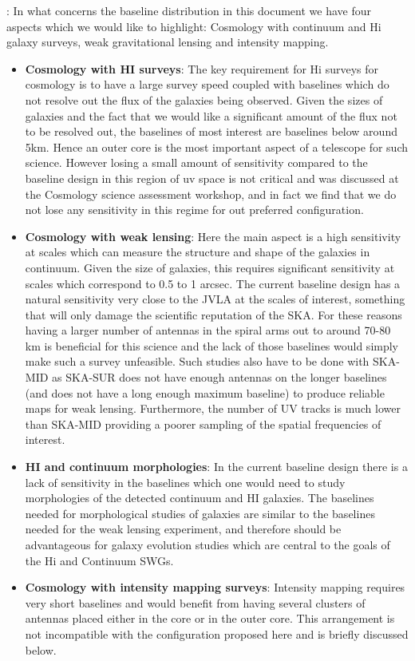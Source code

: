 \documentclass[sfheadings,a4paper,times,9pt,floats,floatfix]{article}
\begin{document}
\smallskip
{}: In what concerns the baseline distribution in this document we have four
aspects which we would like to highlight: Cosmology with continuum and
H{\sc i} galaxy surveys, weak
gravitational lensing and intensity mapping.\\
\begin{itemize}
\item {\bf Cosmology with HI surveys}: The key requirement for H{\sc i}
surveys for cosmology is to have a large
survey speed coupled with baselines which do not resolve out the flux of the galaxies being
observed. Given the sizes of galaxies and the fact that we would like a significant amount of
the flux not to be resolved out, the baselines of most interest are baselines below around
5km. Hence an outer core is the most important aspect of a telescope for such science.
However losing a small amount of sensitivity compared to the baseline design in this region
of uv space is not critical and was discussed at the Cosmology science
assessment workshop, and in fact we find that we do not lose any
sensitivity in this regime for out preferred configuration. 

\item {\bf Cosmology with weak lensing}: Here the main aspect is a high sensitivity at scales which can
measure the structure and shape of the galaxies in continuum. Given the size of galaxies,
this requires significant sensitivity at scales which correspond to
0.5 to 1 arcsec. The current baseline design has a natural sensitivity
very close to the JVLA at the scales of interest, something that will
only damage the scientific reputation of the SKA. 
For these reasons having a larger number of antennas in the spiral arms out to around 70-80
km is beneficial for this science and the lack of those baselines would simply make such a
survey unfeasible. Such studies also have to be done with SKA-MID as SKA-SUR does not have
enough antennas on the longer baselines (and does not have a long
enough maximum baseline) to produce reliable maps for weak
lensing. Furthermore,  the number of UV tracks is much lower than
SKA-MID providing a poorer sampling of the spatial frequencies of
interest. %

\item {\bf HI and continuum morphologies}: In the current baseline design there is a lack of sensitivity
in the baselines which one would need to study morphologies of the detected continuum
and HI galaxies. The baselines needed for morphological studies of galaxies
are similar to the baselines needed for the weak lensing experiment, and therefore should be advantageous for galaxy
evolution studies which are central to the goals of the H{\sc i} and
Continuum SWGs.

\item {\bf Cosmology with intensity mapping surveys}: Intensity mapping requires very short baselines
and would benefit from having several clusters of antennas placed either in the core or in
the outer core. This arrangement is not incompatible with the configuration
proposed here and is briefly discussed below.
\end{itemize}
\end{document}
